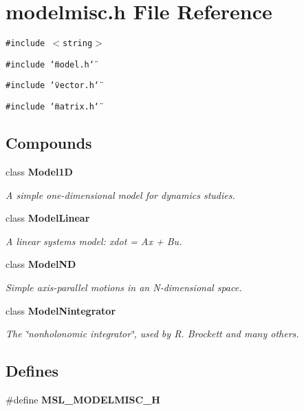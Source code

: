 \section{modelmisc.h File Reference}
\label{modelmisc_8h}
{\tt \#include $<$string$>$}\par
{\tt \#include \char`\"{}model.h\char`\"{}}\par
{\tt \#include \char`\"{}vector.h\char`\"{}}\par
{\tt \#include \char`\"{}matrix.h\char`\"{}}\par
\subsection*{Compounds}
\begin{CompactItemize}
\item 
class {\bf Model1D}
\begin{CompactList}\small\item\em A simple one-dimensional model for dynamics studies.\item\end{CompactList}\item 
class {\bf Model\-Linear}
\begin{CompactList}\small\item\em A linear systems model: xdot = Ax + Bu.\item\end{CompactList}\item 
class {\bf Model\-ND}
\begin{CompactList}\small\item\em Simple axis-parallel motions in an N-dimensional space.\item\end{CompactList}\item 
class {\bf Model\-Nintegrator}
\begin{CompactList}\small\item\em The \char`\"{}nonholonomic integrator\char`\"{}, used by R. Brockett and many others.\item\end{CompactList}\end{CompactItemize}
\subsection*{Defines}
\begin{CompactItemize}
\item 
\#define {\bf MSL\_\-MODELMISC\_\-H}
\end{CompactItemize}


